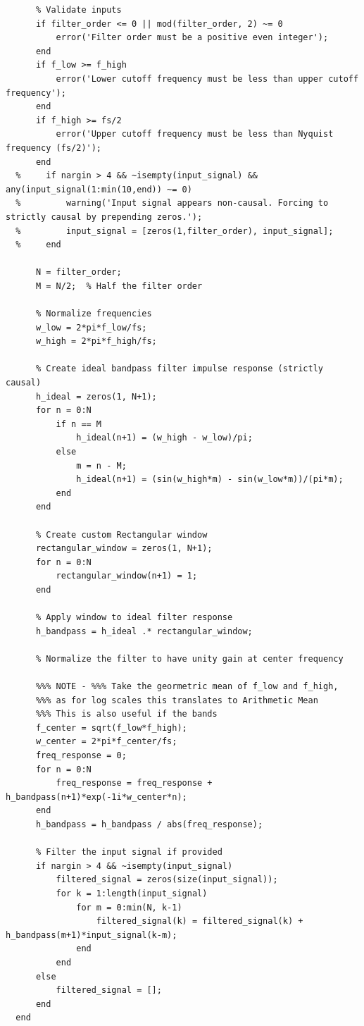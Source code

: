 \documentclass[12pt]{report}
\begin{document}
\begin{lstlisting}
      % Validate inputs
      if filter_order <= 0 || mod(filter_order, 2) ~= 0
          error('Filter order must be a positive even integer');
      end
      if f_low >= f_high
          error('Lower cutoff frequency must be less than upper cutoff frequency');
      end
      if f_high >= fs/2
          error('Upper cutoff frequency must be less than Nyquist frequency (fs/2)');
      end
  %     if nargin > 4 && ~isempty(input_signal) && any(input_signal(1:min(10,end)) ~= 0)
  %         warning('Input signal appears non-causal. Forcing to strictly causal by prepending zeros.');
  %         input_signal = [zeros(1,filter_order), input_signal];
  %     end
      
      N = filter_order;
      M = N/2;  % Half the filter order
      
      % Normalize frequencies
      w_low = 2*pi*f_low/fs;
      w_high = 2*pi*f_high/fs;
      
      % Create ideal bandpass filter impulse response (strictly causal)
      h_ideal = zeros(1, N+1);
      for n = 0:N
          if n == M
              h_ideal(n+1) = (w_high - w_low)/pi;
          else
              m = n - M;
              h_ideal(n+1) = (sin(w_high*m) - sin(w_low*m))/(pi*m);
          end
      end
      
      % Create custom Rectangular window
      rectangular_window = zeros(1, N+1);
      for n = 0:N
          rectangular_window(n+1) = 1;
      end
      
      % Apply window to ideal filter response
      h_bandpass = h_ideal .* rectangular_window;
      
      % Normalize the filter to have unity gain at center frequency
      
      %%% NOTE - %%% Take the geormetric mean of f_low and f_high, 
      %%% as for log scales this translates to Arithmetic Mean
      %%% This is also useful if the bands 
      f_center = sqrt(f_low*f_high); 
      w_center = 2*pi*f_center/fs;
      freq_response = 0;
      for n = 0:N
          freq_response = freq_response + h_bandpass(n+1)*exp(-1i*w_center*n);
      end
      h_bandpass = h_bandpass / abs(freq_response);
      
      % Filter the input signal if provided
      if nargin > 4 && ~isempty(input_signal)
          filtered_signal = zeros(size(input_signal));
          for k = 1:length(input_signal)
              for m = 0:min(N, k-1)
                  filtered_signal(k) = filtered_signal(k) + h_bandpass(m+1)*input_signal(k-m);
              end
          end
      else
          filtered_signal = [];
      end
  end



\end{lstlisting}
\end{document}
